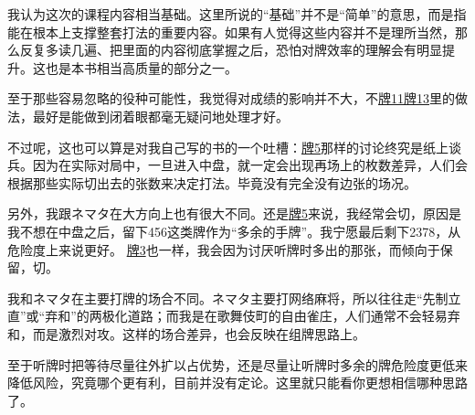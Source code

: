 \vspace*{\fill}
\begin{tcolorbox}[
    title={福地的碎碎念}, fonttitle=\bfseries\Large
]
我认为这次的课程内容相当基础。这里所说的“基础”并不是“简单”的意思，而是指能在根本上支撑整套打法的重要内容。如果有人觉得这些内容并不是理所当然，那么反复多读几遍、把里面的内容彻底掌握之后，恐怕对牌效率的理解会有明显提升。这也是本书相当高质量的部分之一。

至于那些容易忽略的役种可能性，我觉得对成绩的影响并不大，不\hyperref[lec7:pai11-13]{牌11}\hyperref[lec7:pai11-13]{牌13}里的做法，最好是能做到闭着眼都毫无疑问地处理才好。

不过呢，这也可以算是对我自己写的书的一个吐槽：\hyperref[lec7:pai5-7]{牌5}那样的讨论终究是纸上谈兵。因为在实际对局中，一旦进入中盘，就一定会出现再场上的枚数差异，人们会根据那些实际切出去的张数来决定打法。毕竟没有完全没有边张的场况。

另外，我跟ネマタ在大方向上也有很大不同。还是\hyperref[lec7:pai5-7]{牌5}来说，我经常会切，原因是我不想在中盘之后，留下456这类牌作为“多余的手牌”。我宁愿最后剩下2378，从危险度上来说更好。
\hyperref[lec7:pai3]{牌3}也一样，我会因为讨厌听牌时多出的那张，而倾向于保留，切。

我和ネマタ在主要打牌的场合不同。ネマタ主要打网络麻将，所以往往走“先制立直”或“弃和”的两极化道路；而我是在歌舞伎町的自由雀庄，人们通常不会轻易弃和，而是激烈对攻。这样的场合差异，也会反映在组牌思路上。

至于听牌时把等待尽量往外扩以占优势，还是尽量让听牌时多余的牌危险度更低来降低风险，究竟哪个更有利，目前并没有定论。这里就只能看你更想相信哪种思路了。

\end{tcolorbox}